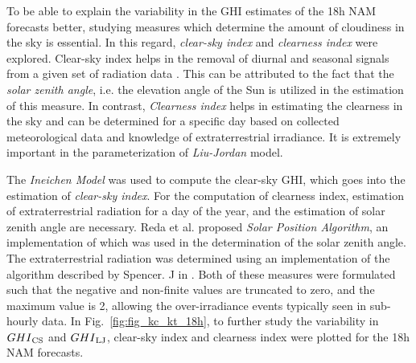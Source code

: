 \par To be able to explain the variability in the GHI estimates of the 18h NAM forecasts better, studying measures which determine the amount of cloudiness in the sky is essential. In this regard, \textit{clear-sky index} and \textit{clearness index} were explored. Clear-sky index helps in the removal of diurnal and seasonal signals from a given set of radiation data \cite{expt_clearsky_index}. This can be attributed to the fact that the \textit{solar zenith angle}, i.e. the elevation angle of the Sun is utilized in the estimation of this measure. In contrast, \textit{Clearness index} helps in estimating the clearness in the sky and can be determined for a specific day based on collected meteorological data and knowledge of extraterrestrial irradiance. It is extremely important in the parameterization of \textit{Liu-Jordan} model. 

\par The \textit{Ineichen Model} was used to compute the clear-sky GHI, which goes into the estimation of \textit{clear-sky index}. For the computation of clearness index, estimation of extraterrestrial radiation for a day of the year, and the estimation of solar zenith angle are necessary. Reda et al. \cite{multimodel_spa} proposed \textit{Solar Position Algorithm}, an implementation of which was used in the determination of the solar zenith angle. The extraterrestrial radiation was determined using an implementation of the algorithm described by Spencer. J in \cite{multimodel_extraterrestrial}. Both of these measures were formulated such that the negative and non-finite values are truncated to zero, and the maximum value is 2, allowing the over-irradiance events typically seen in sub-hourly data. In Fig.~\ref{fig:fig_kc_kt_18h}, to further study the variability in $GHI\textsubscript{CS}$ and $GHI\textsubscript{LJ}$, clear-sky index and clearness index were plotted for the 18h NAM forecasts.

